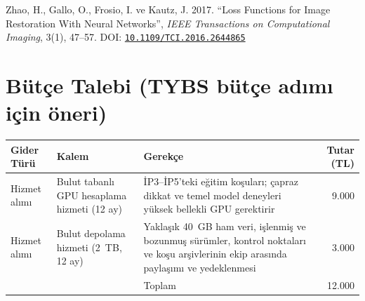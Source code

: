 \documentclass[11pt,a4paper]{article}
\newcommand{\doi}[1]{DOI: \href{https://doi.org/#1}{\nolinkurl{#1}}}
\begin{document}
\begin{list}{}{\setlength{\leftmargin}{1.5em}\setlength{\itemindent}{-1.5em}%
  \setlength{\itemsep}{0.25\baselineskip}\setlength{\parsep}{0pt}}
\item Zhao, H., Gallo, O., Frosio, I. ve Kautz, J. 2017. ``Loss Functions for Image Restoration
With Neural Networks'', \emph{IEEE Transactions on Computational Imaging}, 3(1), 47--57.
\doi{10.1109/TCI.2016.2644865}

\end{list}

\section*{Bütçe Talebi (TYBS bütçe adımı için öneri)}

{\small
\begin{tabularx}{\textwidth}{@{}L{2.6cm}L{3.6cm}Yr@{}}
\toprule
Gider Türü & Kalem & Gerekçe & Tutar (TL) \\
\midrule
Hizmet alımı & Bulut tabanlı GPU hesaplama hizmeti (12 ay)
  & İP3--İP5'teki eğitim koşuları; çapraz dikkat ve temel model deneyleri yüksek bellekli GPU
  gerektirir & 9.000 \\
Hizmet alımı & Bulut depolama hizmeti (2~TB, 12 ay)
  & Yaklaşık 40~GB ham veri, işlenmiş ve bozunmuş sürümler, kontrol noktaları ve koşu
  arşivlerinin ekip arasında paylaşımı ve yedeklenmesi & 3.000 \\
\midrule
 & & Toplam & 12.000 \\
\bottomrule
\end{tabularx}
}
\end{document}
